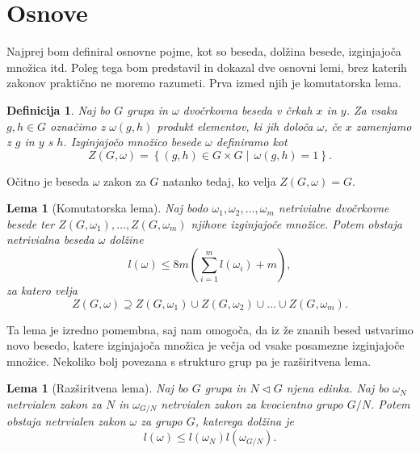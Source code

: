 \documentclass[12pt,a4paper]{article}
\newcounter{theoremcounter}[section] %
\newtheorem{lema}[theoremcounter]{Lema}
\newtheorem{definicija}[theoremcounter]{Definicija}
\begin{document}
\section{Osnove}

Najprej bom definiral osnovne pojme, kot so beseda, dolžina besede, izginjajoča množica itd. Poleg tega bom predstavil in dokazal dve osnovni lemi, brez katerih zakonov praktično ne moremo razumeti. Prva izmed njih je komutatorska lema.
\begin{definicija}
Naj bo $G$ grupa in $\omega$ dvočrkovna beseda v črkah $x$ in $y$. Za vsaka $g, h \in G$ označimo z $\omega(g,h)$ produkt elementov, ki jih določa $\omega$,
če $x$ zamenjamo z $g$ in $y$ s $h$. Izginjajočo množico besede $\omega$ definiramo kot \begin{equation*}
Z(G, \omega) = \left\{ (g,h) \in G \times G  \middle|\,  \omega(g,h) = 1 \right\}. 
\end{equation*}
\end{definicija}

\noindent
Očitno je beseda $\omega$ zakon za $G$ natanko tedaj, ko velja $Z(G, \omega) = G$.

\begin{lema}[Komutatorska lema]
    Naj bodo $\omega_1, \omega_2, \ldots, \omega_m$ netrivialne dvočrkovne besede ter $Z(G, \omega_1), \ldots, Z(G, \omega_m)$ njihove izginjajoče množice. Potem obstaja netrivialna beseda $\omega$ dolžine \begin{equation*}
    l(\omega) \le  8m\left(\sum_{i=1}^{m} l\left(\omega_i\right) + m\right),
    \end{equation*}  
    za katero velja \begin{equation*}
    Z(G, \omega) \supseteq Z(G, \omega_1) \cup  Z(G, \omega_2) \cup \ldots \cup Z(G, \omega_m).
    \end{equation*}  
    \end{lema}

\noindent    
Ta lema je izredno pomembna, saj nam omogoča, da iz že znanih besed ustvarimo novo besedo, katere izginjajoča množica je večja od vsake posamezne izginjajoče množice.  
Nekoliko bolj povezana s strukturo grup pa je razširitvena lema.  \begin{lema}[Razširitvena lema]
    Naj bo $G$ grupa in $N \triangleleft G$ njena edinka. Naj bo $\omega_N$ netrvialen zakon za $N$ in
    $\omega_{G/N}$ netrvialen zakon za kvocientno grupo $G/N$. Potem obstaja netrvialen zakon $\omega$ za grupo $G$, katerega dolžina je \begin{equation*}
    l(\omega) \le  l(\omega_N)l(\omega_{G/N}).
    \end{equation*}  
    \end{lema}
\end{document}
